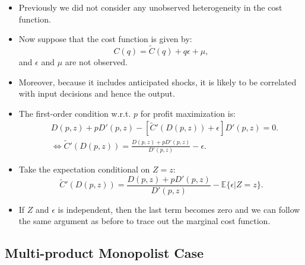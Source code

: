 \documentclass[
]{book}
\begin{document}
\begin{itemize}
\item
  Previously we did not consider any unobserved heterogeneity in the cost function.
\item
  Now suppose that the cost function is given by:
  \begin{equation}
  C(q) = \tilde{C}(q) + q \epsilon + \mu,
  \end{equation}
  and \(\epsilon\) and \(\mu\) are not observed.
\item
  Moreover, because it includes anticipated shocks, it is likely to be correlated with input decisions and hence the output.
\item
  The first-order condition w.r.t. \(p\) for profit maximization is:
  \begin{equation}
  \begin{split}
  &D(p, z) + pD'(p, z) - [\tilde{C}'(D(p, z)) + \epsilon]D'(p, z) = 0.\\
  &\Leftrightarrow \tilde{C}'(D(p, z))  = \frac{D(p, z) + pD'(p, z)}{D'(p,z)} - \epsilon.
  \end{split}
  \end{equation}
\item
  Take the expectation conditional on \(Z = z\):
  \begin{equation}
  \tilde{C}'(D(p, z)) = \frac{D(p, z) + pD'(p, z)}{D'(p, z)} - \mathbb{E}\{\epsilon|Z = z\}.
  \end{equation}
\item
  If \(Z\) and \(\epsilon\) is independent, then the last term becomes zero and we can follow the same argument as before to trace out the marginal cost function.
\end{itemize}

\hypertarget{multi-product-monopolist-case}{%
\subsection{Multi-product Monopolist Case}\label{multi-product-monopolist-case}}
\end{document}

